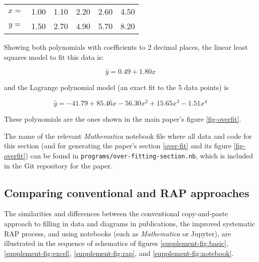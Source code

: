 \documentclass[10pt,a4paper]{article}
\begin{document}
\begin{center}\sf\begin{tabular}{|c|r|r|r|r|r|}\hline
$x={}$&1.00&1.10&2.20&2.60&4.50\\
$y={}$&1.50&2.70&4.90&5.70&8.20\\
\hline\end{tabular}
\end{center}

Showing both polynomials with coefficients to 2 decimal places, the linear least squares model to fit this data is:

$$
\hat{y}=0.49+1.80x
$$

and the Lagrange polynomial model (an exact fit to the 5 data points) is

$$
\hat{y}=-41.79+85.46x-56.30x^2+15.65x^3-1.51x^4
$$

These polynomials are the ones shown in the main paper's figure \ref{fig-overfit}.

The name of the relevant \emph{Mathematica\/} notebook file where all data and code for this section (and for generating the paper's section \ref{over-fit} and its figure \ref{fig-overfit}) can be found in \texttt{programs/over-fitting-section.nb}, which is included in the Git repository for the paper. 

\subsection{Comparing conventional and RAP approaches}
\label{supplement-RAP-diagrams}
The similarities and differences between the conventional copy-and-paste approach to filling in data and diagrams in publications, the improved systematic RAP process, and using notebooks (such as \emph{Mathematica\/} or Jupyter), are illustrated in the sequence of schematics of figures \ref{supplement-fig:basic}, \ref{supplement-fig:excel}, \ref{supplement-fig:rap}, and \ref{supplement-fig:notebook}.
\end{document}
